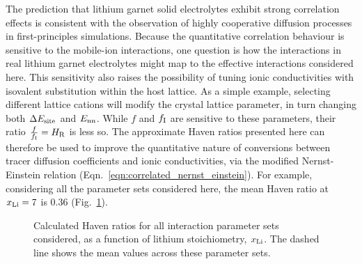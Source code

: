 \documentclass[aps,prb,twocolumn,superscriptaddress,reprint]{revtex4-1}
\newcommand{\xLi}{x_\m{Li}}
\begin{document}
The prediction that lithium garnet solid electrolytes exhibit strong correlation effects is consistent with the observation of highly cooperative diffusion processes in first-principles simulations.\cite{JalemEtAl_ChemMater2013, MeierEtAl_JPhysChemC2014} Because the quantitative correlation behaviour is sensitive to the mobile-ion interactions, one question is how the interactions in real lithium garnet electrolytes might map to the effective interactions considered here. This sensitivity also raises the possibility of tuning ionic conductivities with isovalent substitution within the host lattice. As a simple example, selecting different lattice cations will modify the crystal lattice parameter, in turn changing both $\Delta E_{\mathrm{site}}$ and $E_{\mathrm{nn}}$. While $f$ and $f_{\mathrm{I}}$ are sensitive to these parameters, their ratio $\frac{f}{f_{\mathrm{I}}}=H_{\mathrm{R}}$ is less so. The approximate Haven ratios presented here can therefore be used to improve the quantitative nature of conversions between tracer diffusion coefficients and ionic conductivities, via the modified Nernst-Einstein relation (Eqn.~\ref{eqn:correlated_nernst_einstein}). For example, considering all the parameter sets considered here, the mean Haven ratio at $\xLi=7$ is $0.36$ (Fig.~\ref{fig:haven_ratios}).
\begin{figure}[tb]
  \centering
    \caption{\label{fig:haven_ratios}Calculated Haven ratios for all interaction parameter sets considered, as a function of lithium stoichiometry, $\xLi$. The dashed line shows the mean values across these parameter sets.}
\end{figure}
\end{document}
